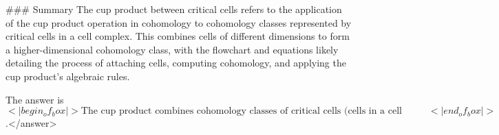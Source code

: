 ### Summary  
The cup product between critical cells refers to the application of the cup product operation in cohomology to cohomology classes represented by critical cells in a cell complex. This combines cells of different dimensions to form a higher-dimensional cohomology class, with the flowchart and equations likely detailing the process of attaching cells, computing cohomology, and applying the cup product’s algebraic rules.  

The answer is \(<|begin_of_box|>\text{The cup product combines cohomology classes of critical cells (cells in a cell complex) to form a higher-dimensional cohomology class, following the rules of cohomology theory.}<|end_of_box|>\).</answer>